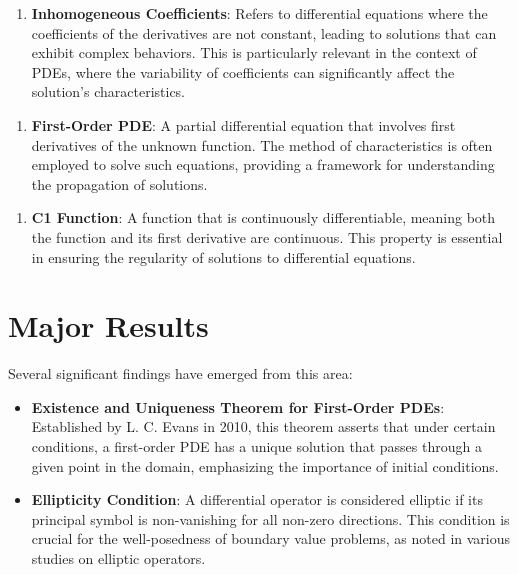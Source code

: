 \documentclass[11pt,a4paper]{article}
\begin{document}
\begin{enumerate}
\item \textbf{Inhomogeneous Coefficients}: Refers to differential equations where the coefficients of the derivatives are not constant, leading to solutions that can exhibit complex behaviors. This is particularly relevant in the context of PDEs, where the variability of coefficients can significantly affect the solution's characteristics.
\end{enumerate}

\begin{enumerate}
\item \textbf{First-Order PDE}: A partial differential equation that involves first derivatives of the unknown function. The method of characteristics is often employed to solve such equations, providing a framework for understanding the propagation of solutions.
\end{enumerate}

\begin{enumerate}
\item \textbf{C1 Function}: A function that is continuously differentiable, meaning both the function and its first derivative are continuous. This property is essential in ensuring the regularity of solutions to differential equations.
\end{enumerate}

\section{Major Results}

Several significant findings have emerged from this area:

\begin{itemize}
\item \textbf{Existence and Uniqueness Theorem for First-Order PDEs}: Established by L. C. Evans in 2010, this theorem asserts that under certain conditions, a first-order PDE has a unique solution that passes through a given point in the domain, emphasizing the importance of initial conditions.
\end{itemize}

\begin{itemize}
\item \textbf{Ellipticity Condition}: A differential operator is considered elliptic if its principal symbol is non-vanishing for all non-zero directions. This condition is crucial for the well-posedness of boundary value problems, as noted in various studies on elliptic operators.
\end{itemize}
\end{document}

